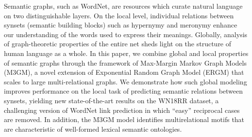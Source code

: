 Semantic graphs, such as WordNet, are resources which curate natural language on two distinguishable layers. On the local level, individual relations between synsets (semantic building blocks) such as hypernymy and meronymy enhance our understanding of the words used to express their meanings. Globally, analysis of graph-theoretic properties of the entire net sheds light on the structure of human language as a whole. In this paper, we combine global and local properties of semantic graphs through the framework of Max-Margin Markov Graph Models (M3GM), a novel extension of Exponential Random Graph Model (ERGM) that scales to large multi-relational graphs. We demonstrate how such global modeling improves performance on the local task of predicting semantic relations between synsets, yielding new state-of-the-art results on the WN18RR dataset, a challenging version of WordNet link prediction in which ``easy'' reciprocal cases are removed. In addition, the M3GM model identifies multirelational motifs that are characteristic of well-formed lexical semantic ontologies.
